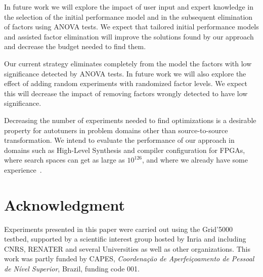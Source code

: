 \documentclass[conference]{IEEEtran}
\begin{document}
In future work we will explore the  impact of user input and expert knowledge in
the selection of the initial performance model and in the subsequent elimination
of factors using ANOVA tests. We expect that tailored initial performance models
and assisted factor elimination will improve the solutions found by our approach
and decrease the budget needed to find them.

Our current strategy  eliminates completely from the model the  factors with low
significance detected  by ANOVA tests. In  future work we will  also explore the
effect of  adding random  experiments with randomized  factor levels.  We expect
this will decrease  the impact of removing factors wrongly  detected to have low
significance.

Decreasing the number of experiments needed to find optimizations is a desirable
property  for   autotuners  in  problem  domains   other  than  source-to-source
transformation. We intend to evaluate the performance of our approach in domains
such as High-Level Synthesis and  compiler configuration for FPGAs, where search
spaces  can  get   as  large  as  \(10^{126}\),  and  where   we  already  have  some
experience~\cite{bruel2017autotuninghls}.
\section*{Acknowledgment}
\label{sec:org3a3ce9b}
Experiments  presented  in this  paper  were  carried  out using  the  Grid'5000
testbed, supported by a scientific interest  group hosted by Inria and including
CNRS, RENATER  and several  Universities as well  as other  organizations.  This
work was  partly funded by CAPES,  \emph{Coordenação de Aperfeiçoamento de  Pessoal de
Nível Superior}, Brazil, funding code 001.



\end{document}
